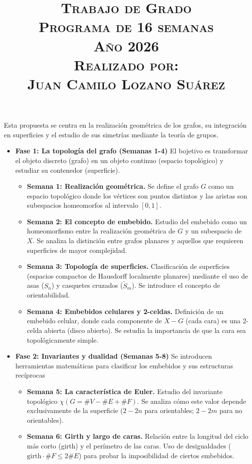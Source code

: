 \documentclass{article}
\title{
  \vspace{-1.5cm}
  \textsc{
    \LARGE{Trabajo de Grado\\ Programa de 16 semanas}\\ \vspace{1cm}
    \large{Año 2026\\ \vspace{1cm} {Realizado por:} \\ \vspace{0.3cm} {Juan Camilo Lozano Suárez}}\\
  }
}
\date{}
\begin{document}
    
    \maketitle
    Esta propuesta se centra en la realización geométrica de los grafos, su integración en superficies y el estudio de sus simetrías mediante la teoría de grupos.
    \begin{itemize}
       \item \textbf{Fase 1: La topología del grafo (Semanas 1-4)} El bojetivo es transformar el objeto discreto (grafo) en un objeto continuo (espacio topológico) y estudiar su contenedor (superficie).
          \begin{itemize}
             \item \textbf{Semana 1: Realización geométrica.} Se define el grafo $G$ como un espacio topológico donde los vértices son puntos distintos y las aristas son subespacios homeomorfos al intervalo $[0,1]$.
             \item \textbf{Semana 2: El concepto de embebido.} Estudio del embebido como un homeomorfismo entre la realización geométrica de $G$ y un subespacio de $X$. Se analiza la distinción entre grafos planares y aquellos que requieren superficies de mayor complejidad.
             \item \textbf{Semana 3: Topología de superficies.} Clasificación de superficies (espacios compactos de Hausdorff localmente planares) mediante el uso de asas ($S_n$) y casquetes cruzados ($\tilde{S}_m$). Se introduce el concepto de orientabilidad.
             \item \textbf{Semana 4: Embebidos celulares y 2-celdas.} Definición de un embebido celular, donde cada componente de $X-G$ (cada cara) es una 2-celda abierta (disco abierto). Se estudia la importancia de que la cara sea topológicamente simple.
          \end{itemize}
       \item \textbf{Fase 2: Invariantes y dualidad (Semanas 5-8)} Se introducen herramientas matemáticas para clasificar los embebidos y sus estructuras recíprocas
          \begin{itemize}
             \item \textbf{Semana 5: La característica de Euler.} Estudio del invariante topológico $\chi(G=\# V- \# E + \# F)$. Se analiza cómo este valor depende exclusivamente de la superficie ($2-2n$ para orientables; $2-2m$ para no orientables).
             \item \textbf{Semana 6: Girth y largo de caras.} Relación entre la longitud del ciclo más corto (girth) y el perímetro de las caras. Uso de desigualdades ($\text{girth}\cdot \# F \leq 2 \# E$) para probar la imposibilidad de ciertos embebidos.

\end{itemize}
\end{itemize}
\end{document}
